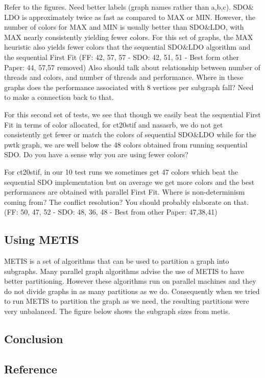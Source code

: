 \documentclass[preprint]{sigplanconf}
\begin{document}
Refer to the figures.  Need better labels (graph names rather than a,b,c).  SDO$\&$LDO is approximately twice as fast as compared to MAX or MIN. However, the number of colors for MAX and MIN is usually better than SDO$\&$LDO, with MAX nearly consistently yielding  fewer colors. For this set of graphs, the MAX heuristic also yields fewer colors that the sequential SDO$\&$LDO algorithm and the sequential First Fit   (FF: 42, 57, 57 - SDO: 42, 51, 51 - Best form other Paper: 44, 57,57 removed)  Also should talk about relationship between number of threads and colors, and number of threads and performance.  Where in these graphs does the performance associated with 8 vertices per subgraph fall?  Need to make a connection back to that.\

For this second set of tests, we see that though we easily beat the sequential First Fit in terms of color allocated, for ct20stif and nasasrb, we do not get consistently get fewer or match the colors of sequential SDO$\&$LDO while for the pwtk graph, we are well below the 48 colors obtained from running sequential SDO.  Do you have a sense why you are using fewer colors?

For ct20stif, in our 10 test runs we sometimes get 47 colors which beat the sequential SDO implementation but on average we get more colors and the best performances are obtained with parallel First Fit. Where is non-determinism coming from?  The conflict resolution?  You should probably elaborate on that.
(FF: 50, 47, 52 - SDO: 48, 36, 48 - Best from other Paper: 47,38,41)\

\subsection{Using METIS}
METIS is a set of algorithms that can be used to partition a graph into subgraphs. Many parallel graph algorithms advise the use of METIS to have better partitioning. However these algorithms run on parallel machines and they do not divide graphs in as many partitions as we do. Consequently when we tried to run METIS to partition the graph as we need, the resulting partitions were very unbalanced. The figure below shows the subgraph sizes from metis.


\subsection{Conclusion}

\subsection{Reference}
\end{document}
